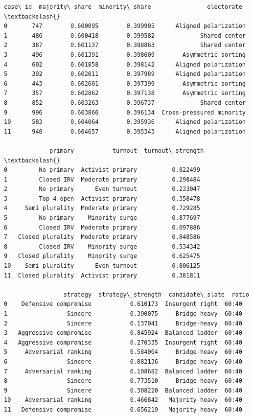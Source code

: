 \documentclass[11pt]{article}
\makeatletter
\newcommand{\boxspacing}{\kern\kvtcb@left@rule\kern\kvtcb@boxsep}
\newcommand{\prompt}[4]{
        {\ttfamily\llap{{\color{#2}[#3]:\hspace{3pt}#4}}\vspace{-\baselineskip}}
    }
\makeatother
\begin{document}
            \begin{tcolorbox}[breakable, size=fbox, boxrule=.5pt, pad at break*=1mm, opacityfill=0]
\prompt{Out}{outcolor}{25}{\boxspacing}
\begin{Verbatim}[commandchars=\\\{\}]
    case\_id  majority\_share  minority\_share                electorate  \textbackslash{}
0       747        0.600095        0.399905      Aligned polarization
1       486        0.600418        0.399582             Shared center
2       387        0.601137        0.398863             Shared center
3       496        0.601391        0.398609        Asymmetric sorting
4       602        0.601858        0.398142      Aligned polarization
5       392        0.602011        0.397989      Aligned polarization
6       443        0.602601        0.397399        Asymmetric sorting
7       357        0.602862        0.397138        Asymmetric sorting
8       852        0.603263        0.396737             Shared center
9       996        0.603866        0.396134  Cross-pressured minority
10      583        0.604064        0.395936      Aligned polarization
11      940        0.604657        0.395343      Aligned polarization

             primary           turnout  turnout\_strength  \textbackslash{}
0         No primary  Activist primary          0.822499
1         Closed IRV  Moderate primary          0.298484
2         No primary      Even turnout          0.233047
3         Top-4 open  Activist primary          0.358478
4     Semi plurality  Moderate primary          0.729285
5         No primary    Minority surge          0.877697
6         Closed IRV  Moderate primary          0.097886
7   Closed plurality  Moderate primary          0.848586
8         Closed IRV    Minority surge          0.534342
9   Closed plurality    Minority surge          0.625475
10    Semi plurality      Even turnout          0.806125
11  Closed plurality  Activist primary          0.381811

                 strategy  strategy\_strength  candidate\_slate  ratio
0    Defensive compromise           0.610173  Insurgent right  60:40
1                 Sincere           0.390075     Bridge-heavy  60:40
2                 Sincere           0.137041     Bridge-heavy  60:40
3   Aggressive compromise           0.845924  Balanced ladder  60:40
4   Aggressive compromise           0.270335  Insurgent right  60:40
5     Adversarial ranking           0.584004     Bridge-heavy  60:40
6                 Sincere           0.882136     Bridge-heavy  60:40
7     Adversarial ranking           0.108682  Balanced ladder  60:40
8                 Sincere           0.773510     Bridge-heavy  60:40
9                 Sincere           0.308220  Balanced ladder  60:40
10    Adversarial ranking           0.466842   Majority-heavy  60:40
11   Defensive compromise           0.656219   Majority-heavy  60:40
\end{Verbatim}
\end{tcolorbox}
        
\end{document}
